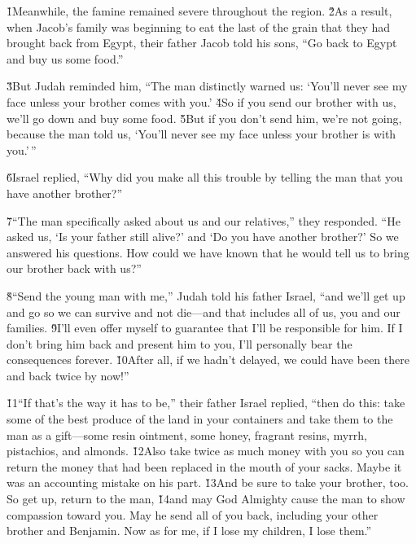 \v{1}Meanwhile, the famine remained severe throughout the region. \v{2}As a result, when Jacob's family was beginning to eat the last of the grain that they had brought back from Egypt, their father Jacob told his sons, ``Go back to Egypt and buy us some food.''

\v{3}But Judah reminded him, ``The man distinctly warned us: `You'll never see my face unless your brother comes with you.' \v{4}So if you send our brother with us, we'll go down and buy some food. \v{5}But if you don't send him, we're not going, because the man told us, `You'll never see my face unless your brother is with you.'\,''

\v{6}Israel replied, ``Why did you make all this trouble by telling the man that you have another brother?''

\v{7}``The man specifically asked about us and our relatives,'' they responded. ``He asked us, `Is your father still alive?' and `Do you have another brother?' So we answered his questions. How could we have known that he would tell us to bring our brother back with us?''

\v{8}``Send the young man with me,'' Judah told his father Israel, ``and we'll get up and go so we can survive and not die---and that includes all of us, you and our families. \v{9}I'll even offer myself to guarantee that I'll be responsible for him. If I don't bring him back and present him to you, I'll personally bear the consequences forever. \v{10}After all, if we hadn't delayed, we could have been there and back twice by now!''

\v{11}``If that's the way it has to be,'' their father Israel replied, ``then do this: take some of the best produce of the land in your containers and take them to the man as a gift---some resin ointment, some honey, fragrant resins, myrrh, pistachios, and almonds. \v{12}Also take twice as much money with you so you can return the money that had been replaced in the mouth of your sacks. Maybe it was an accounting mistake on his part. \v{13}And be sure to take your brother, too. So get up, return to the man, \v{14}and may God Almighty cause the man to show compassion toward you. May he send all of you back, including your other brother and Benjamin. Now as for me, if I lose my children, I lose them.''

